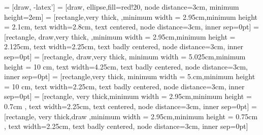\usetikzlibrary{shapes.arrows,shapes.geometric,arrows,shadows,automata,positioning,arrows,calc}
\usetikzlibrary{calc}  
 = [draw, -latex']
 = [draw, ellipse,fill=red!20, node distance=3cm,
    minimum height=2em]
\tikzset{>=latex}
 = [rectangle,very thick, ,minimum width = 2.95cm,minimum height = 2.1cm, text width=2.8cm, text centered, node distance=3cm, inner sep=0pt]
 = [rectangle, draw,very thick, ,minimum width = 2.95cm,minimum height = 2.125cm,    text width=2.25cm, text badly centered, node distance=3cm, inner sep=0pt]
 = [rectangle, draw,very thick, minimum width = 5.025cm,minimum height = 10 cm,    text width=4.25cm, text badly centered, node distance=3cm, inner sep=0pt]
 = [rectangle,very thick, minimum width = 5.cm,minimum height = 10 cm,    text width=2.25cm, text badly centered, node distance=3cm, inner sep=0pt]
 = [rectangle, very thick,minimum width = 2.95cm,minimum height = 0.7cm ,    text width=2.25cm, text centered, node distance=3cm, inner sep=0pt]
 = [rectangle, very thick,draw ,minimum width = 2.95cm,minimum height = 0.75cm ,    text width=2.25cm, text badly centered, node distance=3cm, inner sep=0pt]
\usetikzlibrary{decorations}
\usetikzlibrary{decorations.pathmorphing}
\usetikzlibrary{patterns}


